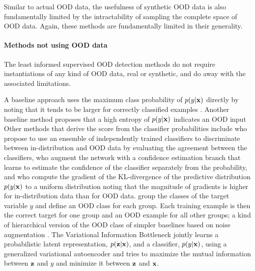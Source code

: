 Similar to actual OOD data, the usefulness of synthetic OOD data is also fundamentally limited by the intractability of sampling the complete space of OOD data. Again, these methods are fundamentally limited in their generality.

\paragraph{Methods not using OOD data}
The least informed supervised OOD detection methods do not require instantiations of any kind of OOD data, real or synthetic, and do away with the associated limitations.

A baseline approach uses the maximum class probability of $p(y|{\mathbf{x}})$ directly by noting that it tends to be larger for correctly classified examples \parencite{hendrycks_baseline_2017}. Another baseline method proposes that a high entropy of $p(y|{\mathbf{x}})$ indicates an OOD input \parencite{ren_likelihood_2019} 
Other methods that derive the score from the classifier probabilities include \textcite{lakshminarayanan_simple_2017} who propose to use an ensemble of independently trained classifiers to discriminate between in-distribution and OOD data by evaluating the agreement between the classifiers, \textcite{devries_learning_2018} who augment the network with a confidence estimation branch that learns to estimate the confidence of the classifier separately from the probability, and \textcite{huang_importance_2021} who compute the gradient of the KL-divergence of the predictive distribution $p(y|{\mathbf{x}})$ to a uniform distribution noting that the magnitude of gradients is higher for in-distribution data than for OOD data. 
\textcite{huang_mos_2021} group the classes of the target variable $y$ and define an OOD class for each group. Each training example is then the correct target for one group and an OOD example for all other groups; a kind of hierarchical version of the OOD class of simpler baselines based on noise augmentation \parencite{ren_likelihood_2019}. 
The Variational Information Bottleneck \parencite{alemi_deep_2017} jointly learns a probabilistic latent representation, $p({\mathbf{z}}|{\mathbf{x}})$, and a classifier, $p(y|{\mathbf{x}})$, using a generalized variational autoencoder \parencite{kingma_autoencoding_2014} and tries to maximize the mutual information between ${\mathbf{z}}$ and $y$ and minimize it between ${\mathbf{z}}$ and ${\mathbf{x}}$.


